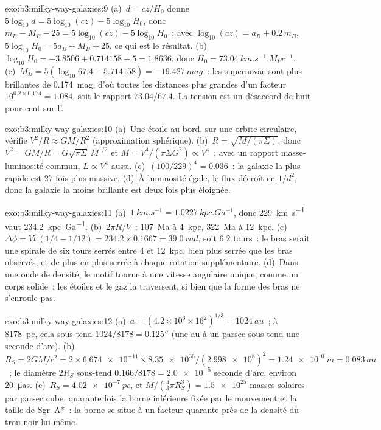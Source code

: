 \begin{solution}{exo:b3:milky-way-galaxies:9}
(a)~$d = cz/H_0$ donne $5\log_{10}d = 5\log_{10}(cz) - 5\log_{10}H_0$,
donc $m_B - M_B - 25 = 5\log_{10}(cz) - 5\log_{10}H_0$~; avec
$\log_{10}(cz) = a_B + 0.2\,m_B$, $5\log_{10}H_0 = 5a_B + M_B + 25$, ce qui
est le résultat. (b)~$\log_{10}H_0 = -3.8506 + 0.714158 + 5 = 1.8636$, donc
$H_0 = \qty{73.04}{km.s^{-1}.Mpc^{-1}}$. (c)~$M_B = 5(\log_{10}67.4 -
5.714158) = \qty{-19.427}{mag}$~: les supernovae sont plus brillantes de \qty{0.174}{mag},
d'où toutes les distances plus grandes d'un facteur $10^{0.2\times0.174} = 1.084$, soit le
rapport $73.04/67.4$. La tension est un désaccord de huit pour cent sur
l'.
\end{solution}

\begin{solution}{exo:b3:milky-way-galaxies:10}
(a)~Une étoile au bord, sur une orbite circulaire, vérifie $V^2/R \approx GM/R^2$
(approximation sphérique). (b)~$R = \sqrt{M/(\pi\Sigma)}$, donc $V^2 =
GM/R = G\sqrt{\pi\Sigma}\,M^{1/2}$ et $M = V^4/(\pi\Sigma G^2) \propto
V^4$~; avec un rapport masse-luminosité commun, $L \propto V^4$ aussi.
(c)~$(100/229)^4 = \num{0.036}$~: la galaxie la plus rapide est 27 fois plus
massive. (d)~À luminosité égale, le flux décroît en $1/d^2$, donc la galaxie la
moins brillante est deux fois plus éloignée.
\end{solution}

\begin{solution}{exo:b3:milky-way-galaxies:11}
(a)~$\qty{1}{km.s^{-1}} = \qty{1.0227}{kpc.Ga^{-1}}$, donc
\qty{229}{km.s^{-1}} vaut \qty{234.2}{kpc.Ga^{-1}}. (b)~$2\pi R/V$~:
\qty{107}{Ma} à \qty{4}{kpc}, \qty{322}{Ma} à \qty{12}{kpc}.
(c)~$\Delta\phi = Vt\,(1/4 - 1/12) = 234.2\times0.1667 = \qty{39.0}{rad}$,
soit 6.2 tours~: le bras serait une spirale de six tours serrés entre 4 et
\qty{12}{kpc}, bien plus serrée que les bras observés, et de plus en plus serrée à chaque
rotation supplémentaire. (d)~Dans une onde de densité, le motif tourne à une vitesse angulaire
unique, comme un corps solide~; les étoiles et le gaz la traversent, si bien que la forme
des bras ne s'enroule pas.
\end{solution}

\begin{solution}{exo:b3:milky-way-galaxies:12}
(a)~$a = (4.2\times10^6\times16^2)^{1/3} = \qty{1024}{au}$~; à
\qty{8178}{pc}, cela sous-tend $1024/8178 = \ang{;;0.125}$ (une au à un parsec
sous-tend une seconde d'arc). (b)~$R_S = 2GM/c^2 = 2\times\num{6.674e-11}
\times\num{8.35e36}/(\num{2.998e8})^2 = \qty{1.24e10}{m} = \qty{0.083}{au}$~;
le diamètre $2R_S$ sous-tend $0.166/8178 = \num{2.0e-5}$ seconde d'arc, environ
\qty{20}{\micro as}. (c)~$R_S = \qty{4.02e-7}{pc}$, et $M/(\tfrac43\pi
R_S^3) = \num{1.5e25}$ masses solaires par parsec cube, quarante fois la
borne inférieure fixée par le mouvement et la taille de Sgr~A*~: la borne se
situe à un facteur quarante près de la densité du trou noir lui-même.
\end{solution}

